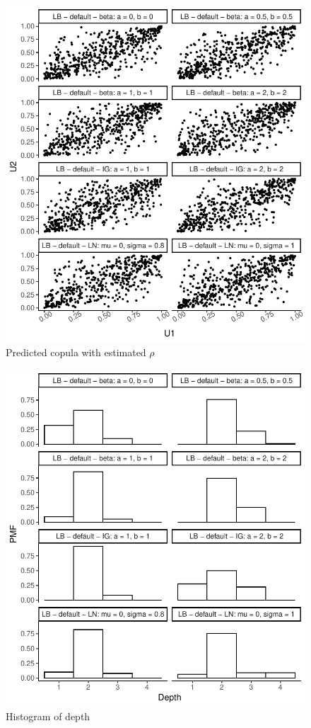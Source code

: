 \documentclass{amsart}
\begin{document}
\begin{figure}[ht]
	\centering
	\includegraphics[width=0.95\linewidth]{simulated_copula_1.pdf}
	\caption{Predicted copula with estimated $\rho$}
	\label{fig:sim:copula:1}
\end{figure}

%
\begin{figure}[ht]
	\centering
	\includegraphics[width=0.95\linewidth]{hist_depth_2.pdf}
	\caption{Histogram of depth}
	\label{fig:hist:depth:2}
\end{figure}
\end{document}
